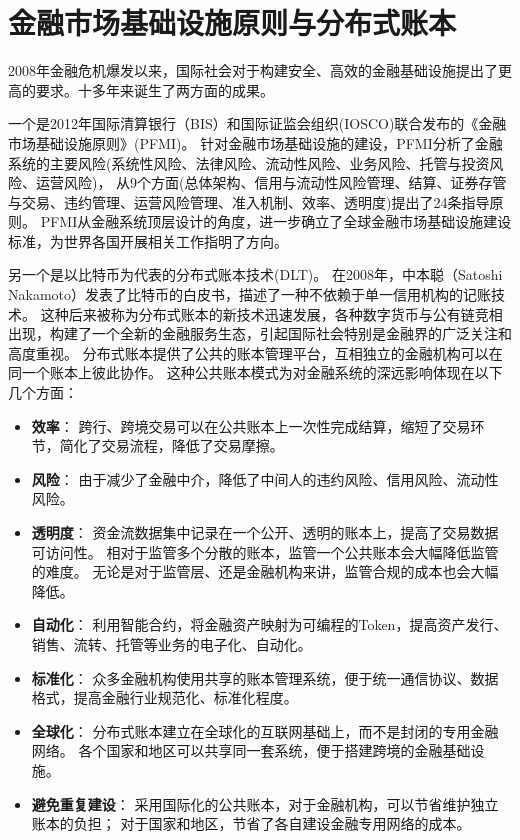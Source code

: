 \section{金融市场基础设施原则与分布式账本}\label{sec:pfmi}

2008年金融危机爆发以来，国际社会对于构建安全、高效的金融基础设施提出了更高的要求。十多年来诞生了两方面的成果。

一个是2012年国际清算银行（BIS）和国际证监会组织(IOSCO)联合发布的《金融市场基础设施原则》(PFMI)\cite{pfmi}。
针对金融市场基础设施的建设，PFMI分析了金融系统的主要风险(系统性风险、法律风险、流动性风险、业务风险、托管与投资风险、运营风险)，
从9个方面(总体架构、信用与流动性风险管理、结算、证券存管与交易、违约管理、运营风险管理、准入机制、效率、透明度)提出了24条指导原则。
PFMI从金融系统顶层设计的角度，进一步确立了全球金融市场基础设施建设标准，为世界各国开展相关工作指明了方向。

另一个是以比特币为代表的分布式账本技术(DLT)。
在2008年，中本聪（Satoshi Nakamoto）发表了比特币的白皮书，描述了一种不依赖于单一信用机构的记账技术。
这种后来被称为分布式账本的新技术迅速发展，各种数字货币与公有链竞相出现，构建了一个全新的金融服务生态，引起国际社会特别是金融界的广泛关注和高度重视。
分布式账本提供了公共的账本管理平台，互相独立的金融机构可以在同一个账本上彼此协作。
这种公共账本模式为对金融系统的深远影响体现在以下几个方面：

\begin{itemize}
    \item[\dag] \textbf{效率}：
    跨行、跨境交易可以在公共账本上一次性完成结算，缩短了交易环节，简化了交易流程，降低了交易摩擦。

    \item[\dag] \textbf{风险}：
    由于减少了金融中介，降低了中间人的违约风险、信用风险、流动性风险。

    \item[\dag] \textbf{透明度}：
    资金流数据集中记录在一个公开、透明的账本上，提高了交易数据可访问性。
    相对于监管多个分散的账本，监管一个公共账本会大幅降低监管的难度。
    无论是对于监管层、还是金融机构来讲，监管合规的成本也会大幅降低。
    
    \item[\dag] \textbf{自动化}：
    利用智能合约，将金融资产映射为可编程的Token，提高资产发行、销售、流转、托管等业务的电子化、自动化。
    
    \item[\dag] \textbf{标准化}：
    众多金融机构使用共享的账本管理系统，便于统一通信协议、数据格式，提高金融行业规范化、标准化程度。
    
    \item[\dag] \textbf{全球化}：
    分布式账本建立在全球化的互联网基础上，而不是封闭的专用金融网络。
    各个国家和地区可以共享同一套系统，便于搭建跨境的金融基础设施。
    
    \item[\dag] \textbf{避免重复建设}：
    采用国际化的公共账本，对于金融机构，可以节省维护独立账本的负担；
    对于国家和地区，节省了各自建设金融专用网络的成本。
\end{itemize}

